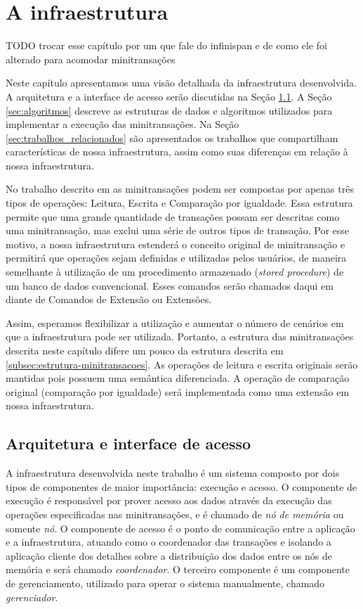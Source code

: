 \documentclass[11pt,twoside,a4paper]{book}
\begin{document}
\chapter{A infraestrutura}
\label{chap:implementacao}
TODO trocar esse capítulo por um que fale do infinispan e de como ele foi
alterado para acomodar minitransações 

Neste capítulo apresentamos uma visão detalhada da infraestrutura
desenvolvida. A arquitetura e a interface de acesso serão discutidas na Seção \ref{sec:arquitetura}. A Seção \ref{sec:algoritmos} descreve as estruturas de dados e algoritmos utilizados para implementar a execução das minitransações. Na Seção \ref{sec:trabalhos_relacionados} são apresentados os trabalhos que compartilham características de nossa infraestrutura, assim como suas diferenças em relação à nossa infraestrutura.

No trabalho descrito em \cite{sinfonia} as minitransações podem ser compostas por apenas três tipos de operações: Leitura, Escrita e Comparação por igualdade. Essa estrutura permite que uma grande quantidade de transações possam ser descritas como uma minitransação, mas exclui uma série de outros tipos de transação. Por esse motivo, a nossa infraestrutura estenderá o conceito original de minitransação e permitirá que operações sejam definidas e utilizadas pelos usuários, de maneira semelhante à utilização de um procedimento armazenado (\emph{stored procedure}) de um banco de dados convencional. Esses comandos serão chamados daqui em diante de Comandos de Extensão ou Extensões.

Assim, esperamos flexibilizar a utilização e aumentar o número de cenários em que a infraestrutura pode ser utilizada. Portanto, a estrutura das minitransações descrita neste capítulo difere um pouco da estrutura descrita em \ref{subsec:estrutura-minitransacoes}. As operações de leitura e escrita originais serão mantidas pois possuem uma semântica diferenciada. A operação de comparação original (comparação por igualdade) será implementada como uma extensão em nossa infraestrutura.

\section{Arquitetura e interface de acesso}
\label{sec:arquitetura}
A infraestrutura desenvolvida neste trabalho é um sistema composto por dois tipos de componentes de maior importância: execução e acesso. O componente de execução é responsável por prover acesso aos dados através da execução das operações especificadas nas minitransações, e é chamado de \emph{nó de memória} ou somente \emph{nó}. O componente de acesso é o ponto de comunicação entre a aplicação e a infraestrutura, atuando como o coordenador das transações e isolando a aplicação cliente dos detalhes sobre a distribuição dos dados entre os nós de memória e será chamado \emph{coordenador}. O terceiro componente é um componente de gerenciamento, utilizado para operar o sistema manualmente, chamado \emph{gerenciador}.
\end{document}
